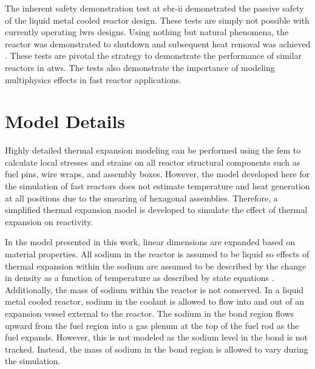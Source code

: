   The inherent safety demonstration test at \gls{ebr-ii} demonstrated the
  passive safety of the liquid metal cooled reactor design. These tests are
  simply not possible with currently operating \glspl{lwr} designs. Using
  nothing but natural phenomena, the reactor was demonstrated to shutdown and
  subsequent heat removal was achieved \cite{ebriitests}. These tests are
  pivotal the strategy to demonstrate the performance of similar reactors in
  \gls{atws}. The tests also demonstrate the importance of modeling multiphysics
  effects in fast reactor applications.

\section{Model Details}
  \label{sec:model_details}
  Highly detailed thermal expansion modeling can be performed using the
  \gls{fem} to calculate local stresses and strains on all reactor
  structural components such as fuel pins, wire wraps, and assembly boxes. 
  However, the model developed here for the simulation of
  fast reactors does not estimate temperature and heat generation at all 
  positions due to the smearing of hexagonal assemblies. Therefore, a simplified 
  thermal expansion model is developed to simulate the effect of thermal 
  expansion on reactivity.

  In the model presented in this work, linear dimensions are expanded based on 
  material properties. All sodium in the reactor is assumed to be liquid so 
  effects of thermal expansion within the sodium are assumed to be described by 
  the change in density as a function of temperature as described by state 
  equations \cite{sodiumProp}. Additionally, the mass of sodium within the 
  reactor is not conserved. In a liquid metal cooled reactor, sodium in the 
  coolant is allowed to flow into and out of an expansion vessel external to the 
  reactor. The sodium in the bond region flows upward from the fuel region into 
  a gas plenum at the top of the fuel rod as the fuel expands. However, this is 
  not modeled as the sodium level in the bond is not tracked. Instead, the mass 
  of sodium in the bond region is allowed to vary during the simulation.

